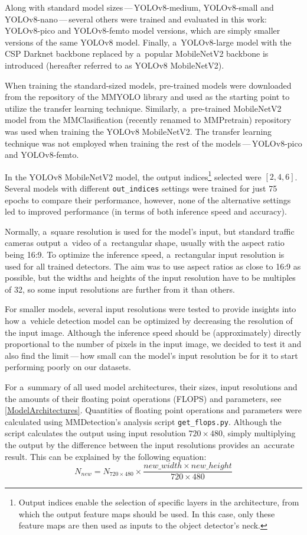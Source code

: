 Along with standard model sizes\,---\,YOLOv8-medium, YOLOv8-small and
YOLOv8-nano\,---\,several others were trained and evaluated in this work:
YOLOv8-pico and YOLOv8-femto model versions, which are simply smaller versions
of the same YOLOv8 model. Finally, a~YOLOv8-large model with the CSP Darknet
backbone replaced by a~popular MobileNetV2 backbone is introduced (hereafter
referred to as YOLOv8 MobileNetV2).

When training the standard-sized models, pre-trained
models were downloaded from the repository of the MMYOLO library and used as the
starting point to utilize the transfer learning technique. Similarly,
a~pre-trained MobileNetV2 model from the MMClasification (recently renamed to
MMPretrain) repository was used when training the YOLOv8 MobileNetV2. The
transfer learning technique was not employed when training the rest of the
models\,---\,YOLOv8-pico and YOLOv8-femto.

In the YOLOv8 MobileNetV2 model, the output indices\footnote{Output indices
enable the selection of specific layers in the architecture, from which the
output feature maps should be used. In this case, only these feature maps are
then used as inputs to the object detector's neck.} selected were $[2, 4, 6]$.
Several models with different \texttt{out\_indices} settings were trained for
just 75 epochs to compare their performance, however, none of the alternative
settings led to improved performance (in terms of both inference speed and
accuracy).

Normally, a~square resolution is used for the model's input, but standard traffic cameras
output a~video of a~rectangular shape, usually with the aspect ratio being 16:9.
To optimize the inference speed, a~rectangular input resolution is used for all
trained detectors. The aim was to use aspect ratios as close to 16:9 as
possible, but the widths and heights of the input resolution have to be multiples of
32, so some input resolutions are further from it than others.

For smaller models, several input resolutions were tested to provide insights
into how a~vehicle detection model can be optimized by decreasing the resolution
of the input image. Although the inference speed should be (approximately)
directly proportional to the number of pixels in the input image, we decided to
test it and also find the limit\,---\,how small can the model's input resolution
be for it to start performing poorly on our datasets.

For a~summary of all used model architectures, their sizes, input resolutions and the
amounts of their floating point operations (FLOPS) and parameters, see
\autoref{ModelArchitectures}. Quantities of floating point operations and
parameters were calculated using MMDetection's analysis script
\verb|get_flops.py|. Although the script calculates the output using input
resolution $720 \times 480$, simply multiplying the output by the difference
between the input resolutions provides an~accurate result. This can be explained
by the following equation:
\begin{equation}
    N_{new} = N_{720 \times 480} \times \frac{new\_width \times new\_height}{720 \times 480}
\end{equation}

